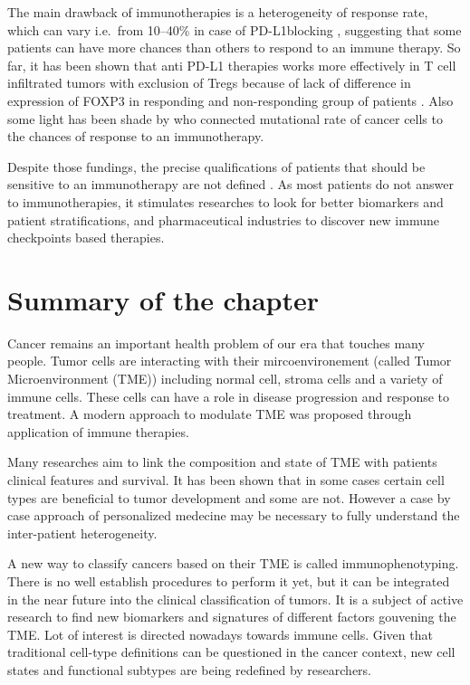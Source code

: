 \documentclass[12pt,]{book}
\theoremstyle{definition}
\theoremstyle{definition}
\theoremstyle{definition}
\theoremstyle{remark}
\begin{document}
The main drawback of immunotherapies is a heterogeneity of response
rate, which can vary i.e.~from 10--40\% in case of PD-L1blocking
\citep{Zou2016}, suggesting that some patients can have more chances
than others to respond to an immune therapy. So far, it has been shown
that anti PD-L1 therapies works more effectively in T cell infiltrated
tumors with exclusion of Tregs because of lack of difference in
expression of FOXP3 in responding and non-responding group of patients
\citep{Herbst2014}. Also some light has been shade by \citet{Rizvi2015}
who connected mutational rate of cancer cells to the chances of response
to an immunotherapy.

Despite those fundings, the precise qualifications of patients that
should be sensitive to an immunotherapy are not defined
\citep{Pitt2016}. As most patients do not answer to immunotherapies, it
stimulates researches to look for better biomarkers and patient
stratifications, and pharmaceutical industries to discover new immune
checkpoints based therapies.

\hypertarget{summary-of-the-chapter}{%
\section{Summary of the chapter}\label{summary-of-the-chapter}}

Cancer remains an important health problem of our era that touches many
people. Tumor cells are interacting with their mircoenvironement (called
Tumor Microenvironment (TME)) including normal cell, stroma cells and a
variety of immune cells. These cells can have a role in disease
progression and response to treatment. A modern approach to modulate TME
was proposed through application of immune therapies.

Many researches aim to link the composition and state of TME with
patients clinical features and survival. It has been shown that in some
cases certain cell types are beneficial to tumor development and some
are not. However a case by case approach of personalized medecine may be
necessary to fully understand the inter-patient heterogeneity.

A new way to classify cancers based on their TME is called
immunophenotyping. There is no well establish procedures to perform it
yet, but it can be integrated in the near future into the clinical
classification of tumors. It is a subject of active research to find new
biomarkers and signatures of different factors gouvening the TME. Lot of
interest is directed nowadays towards immune cells. Given that
traditional cell-type definitions can be questioned in the cancer
context, new cell states and functional subtypes are being redefined by
researchers.
\end{document}
